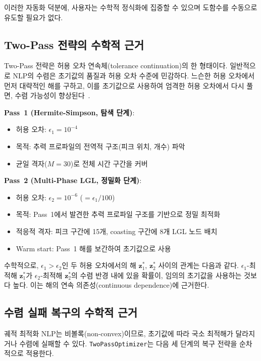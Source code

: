 \documentclass[11pt]{article}
\begin{document}
이러한 자동화 덕분에, 사용자는 수학적 정식화에 집중할 수 있으며 도함수를 수동으로 유도할 필요가 없다.

\subsection{Two-Pass 전략의 수학적 근거}

Two-Pass 전략은 허용 오차 연속체(tolerance continuation)의 한 형태이다. 일반적으로 NLP의 수렴은 초기값의 품질과 허용 오차 수준에 민감하다. 느슨한 허용 오차에서 먼저 대략적인 해를 구하고, 이를 초기값으로 사용하여 엄격한 허용 오차에서 다시 풀면, 수렴 가능성이 향상된다~\cite{Betts2010}.

\textbf{Pass~1 (Hermite-Simpson, 탐색 단계)}:

\begin{itemize}[leftmargin=*]
  \item 허용 오차: $\epsilon_1 = 10^{-4}$
  \item 목적: 추력 프로파일의 전역적 구조(피크 위치, 개수) 파악
  \item 균일 격자($M = 30$)로 전체 시간 구간을 커버
\end{itemize}

\textbf{Pass~2 (Multi-Phase LGL, 정밀화 단계)}:

\begin{itemize}[leftmargin=*]
  \item 허용 오차: $\epsilon_2 = 10^{-6}$ ($= \epsilon_1 / 100$)
  \item 목적: Pass~1에서 발견한 추력 프로파일 구조를 기반으로 정밀 최적화
  \item 적응적 격자: 피크 구간에 15개, coasting 구간에 8개 LGL 노드 배치
  \item Warm start: Pass~1 해를 보간하여 초기값으로 사용
\end{itemize}

수학적으로, $\epsilon_1 > \epsilon_2$인 두 허용 오차에서의 해 $\mathbf{z}_1^*$, $\mathbf{z}_2^*$ 사이의 관계는 다음과 같다. $\epsilon_1$-최적해 $\mathbf{z}_1^*$가 $\epsilon_2$-최적해 $\mathbf{z}_2^*$의 수렴 반경 내에 있을 확률이, 임의의 초기값을 사용하는 것보다 높다. 이는 해의 연속 의존성(continuous dependence)에 근거한다.

\subsection{수렴 실패 복구의 수학적 근거}

궤적 최적화 NLP는 비볼록(non-convex)이므로, 초기값에 따라 국소 최적해가 달라지거나 수렴에 실패할 수 있다. \texttt{TwoPassOptimizer}는 다음 세 단계의 복구 전략을 순차적으로 적용한다.
\end{document}
